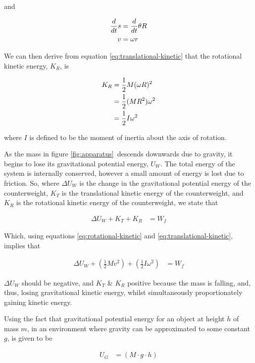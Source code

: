 \documentclass[coverpage]{article}
\begin{document}
	and 
	
	\begin{align}
		\frac{d}{dt}s&=\frac{d}{dt}\theta R \notag \\
		v&=\omega r \label{eq:omega-v-relationship}
	\end{align}

	We can then derive from equation \ref{eq:translational-kinetic} that the rotational kinetic energy, $K_R$, is
	
	\begin{align}
		K_R&=\frac{1}{2}M(\omega R)^2 \notag \\
		&=\frac{1}{2} (M R^2) \omega^2 \notag \\
		&=\frac{1}{2} I \omega^2 \label{eq:rotational-kinetic}
	\end{align}

	where $I$ is defined to be the moment of inertia about the axis of rotation.
	
	As the mass in figure \ref{fig:apparatus}~descends downwards due to gravity, it begins to lose its gravitational potential energy, $U_W$. The total energy of the system is internally conserved, however a small amount of energy is lost due to friction. So, where $\Delta{U}_W$ is the change in the gravitational potential energy of the counterweight, $K_T$ is the translational kinetic energy of the counterweight, and $K_R$ is the rotational kinetic energy of the counterweight, we state that
	
	\begin{align}
		\Delta{U}_W + K_T + K_R&=W_f
	\end{align}

	Which, using equations \ref{eq:rotational-kinetic} and \ref{eq:translational-kinetic}, implies that
	
	\begin{align}
		\Delta{U}_W + (\frac{1}{2} M v^2) + (\frac{1}{2} I \omega^2)&=W_f
	\end{align}

	$\Delta{U}_W$ should be negative, and $K_T$ \& $K_R$ positive because the mass is falling, and, thus, losing gravitational kinetic energy, whilst simultaneously proportionately gaining kinetic energy.
	
	Using the fact that gravitational potential energy for an object at height $h$ of mass $m$, in an environment where gravity can be approximated to some constant $g$, is given to be
	
	\begin{align}
		U_G&=(M \cdot g \cdot h)
	\end{align}
	
\end{document}
